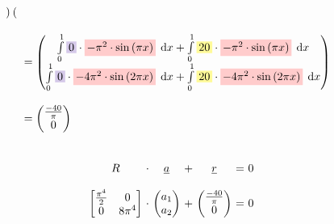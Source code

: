 \documentclass[
final,
a4paper,
oneside,
parskip=full,
headings=standardclasses,
headings=big,
pointednumbers,
fleqn
]{scrartcl}
\newcommand{\tfilly}[1]{\tfillc[#1][yellow!40]}
\newcommand{\tfillr}[1]{\tfillc[#1][red!20]}
\newcommand{\tfillv}[1]{\tfillc[#1][Violet!20]}
\newcommand*\difx{\; \mathop{}\!\mathrm{d}x}
\newcommand{\f}[2]{\frac{#1}{#2}}
\newcommand{\kl}[1]{{\left( #1 \right)}}
\begin{document}
{\begin{align*}
\begin{array}{ll}
\begin{pmatrix}
            \end{pmatrix} \\
            & \\
            & = \begin{pmatrix}
                \int\limits_{0}^{1}{\tfillv{$0$}       \cdot \tfillr{$-\pi^2 \cdot \sin\kl{\pi x}$} \difx} +
                \int\limits_{0}^{1}{\tfilly{$20$}      \cdot \tfillr{$-\pi^2 \cdot \sin\kl{\pi x}$} \difx} \\
                \int\limits_{0}^{1}{\tfillv{$0$}       \cdot \tfillr{$-4 \pi^2 \cdot \sin\kl{2 \pi x}$} \difx} +
                \int\limits_{0}^{1}{\tfilly{$20$}      \cdot \tfillr{$-4 \pi^2 \cdot \sin\kl{2 \pi x}$} \difx}
            \end{pmatrix} \\
            & \\
            & = \begin{pmatrix}
                \f{-40}{\pi} \\
                0
            \end{pmatrix}
        \end{array}
    \end{align*}} \\
    {\setlength{\abovedisplayskip}{6pt}
    \setlength{\belowdisplayskip}{-12pt}
    \begin{align*}
        \begin{array}{c@{\ }c@{\ }c@{\ }c@{\ }c@{\ }c@{\ }l}
            R & \cdot & \uline{a} & + & \uline{r} & = & 0 \\
            \\
            \begin{bmatrix}
                \f{\pi^4}{2} & 0 \\
                0             & 8\pi^4
            \end{bmatrix} & \cdot &
            \begin{pmatrix}
                a_1 \\
                a_2
            \end{pmatrix} & + &
            \begin{pmatrix}
                \f{-40}{\pi} \\
                0
            \end{pmatrix} & = & 0
            \\
        \end{array}
    \end{align*}} \\
\end{document}
